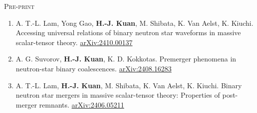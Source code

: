 \documentclass[11pt,a4paper,sans]{moderncv}
\begin{document}
\vspace{1cm}
\noindent
{\Large \textsc{Pre-print} }
\\
\begin{enumerate}
	\item A. T.-L. Lam, Yong Gao, \textbf{H.-J. Kuan}, M. Shibata, K. Van Aelst, K. Kiuchi. Accessing universal relations of binary neutron star waveforms in massive scalar-tensor theory. \href{https://arxiv.org/abs/2410.00137 }{arXiv:2410.00137 }
	\item A. G. Suvorov, \textbf{H.-J. Kuan}, K. D. Kokkotas. Premerger phenomena in neutron-star binary coalescences. \href{https://arxiv.org/abs/2408.16283}{arXiv:2408.16283 }
	\item A. T.-L. Lam, \textbf{H.-J. Kuan}, M. Shibata, K. Van Aelst, K. Kiuchi. Binary neutron star mergers in massive scalar-tensor theory: Properties of post-merger remnants. \href{https://arxiv.org/abs/2406.05211}{arXiv:2406.05211}
\end{enumerate}
\end{document}
